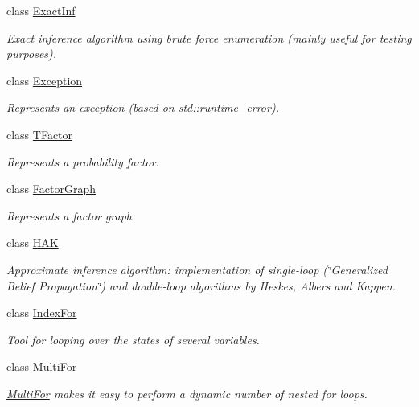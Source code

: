 \begin{CompactItemize}
class \hyperlink{classdai_1_1ExactInf}{ExactInf}
\begin{CompactList}\small\item\em Exact inference algorithm using brute force enumeration (mainly useful for testing purposes). \item\end{CompactList}\item 
class \hyperlink{classdai_1_1Exception}{Exception}
\begin{CompactList}\small\item\em Represents an exception (based on std::runtime\_\-error). \item\end{CompactList}\item 
class \hyperlink{classdai_1_1TFactor}{TFactor}
\begin{CompactList}\small\item\em Represents a probability factor. \item\end{CompactList}\item 
class \hyperlink{classdai_1_1FactorGraph}{FactorGraph}
\begin{CompactList}\small\item\em Represents a factor graph. \item\end{CompactList}\item 
class \hyperlink{classdai_1_1HAK}{HAK}
\begin{CompactList}\small\item\em Approximate inference algorithm: implementation of single-loop (\char`\"{}Generalized Belief Propagation\char`\"{}) and double-loop algorithms by Heskes, Albers and Kappen. \item\end{CompactList}\item 
class \hyperlink{classdai_1_1IndexFor}{IndexFor}
\begin{CompactList}\small\item\em Tool for looping over the states of several variables. \item\end{CompactList}\item 
class \hyperlink{classdai_1_1MultiFor}{MultiFor}
\begin{CompactList}\small\item\em \hyperlink{classdai_1_1MultiFor}{MultiFor} makes it easy to perform a dynamic number of nested for loops. \item\end{CompactList}\item 

\end{CompactItemize}
